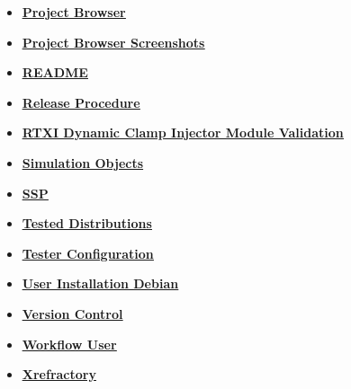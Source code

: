 \documentclass[12pt]{article}
\begin{document}
\begin{itemize}
\item \href{../project-browser/project-browser.pdf}{\bf \underline{Project Browser}}

\item \href{../project-browser-screenshots/project-browser-screenshots.pdf}{\bf \underline{Project Browser Screenshots}}

\item \href{../README/README.pdf}{\bf \underline{README}}

\item \href{../release-procedure/release-procedure.pdf}{\bf \underline{Release Procedure}}

\item \href{../rtxi-injector-validation/rtxi-injector-validation.pdf}{\bf \underline{RTXI Dynamic Clamp Injector Module Validation}}

\item \href{../simulation-objects/simulation-objects.pdf}{\bf \underline{Simulation Objects}}

\item \href{../ssp/ssp.pdf}{\bf \underline{SSP}}

\item \href{../tested-distributions/tested-distributions.pdf}{\bf \underline{Tested Distributions}}

\item \href{../tester-configuration/tester-configuration.pdf}{\bf \underline{Tester Configuration}}

\item \href{../installation-debian/installation-debian.pdf}{\bf \underline{User Installation Debian}}

\item \href{../version-control/version-control.pdf}{\bf \underline{Version Control}}

\item \href{../workflow-user/workflow-user.pdf}{\bf \underline{Workflow User}}

\item \href{../cxref/cxref.pdf}{\bf \underline{Xrefractory}}


\end{itemize}

\end{document}
